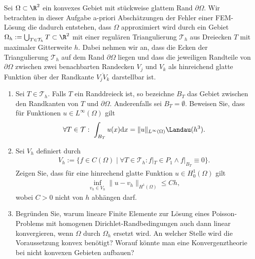 
\begin{exercise}

Sei $\Omega \subset \R^2$ ein konvexes Gebiet mit stückweise glattem Rand
$\partial \Omega$. Wir betrachten in dieser Aufgabe a-priori Abschätzungen der
Fehler einer FEM-Lösung die dadurch entstehen, dass $\Omega$ approximiert wird
durch ein Gebiet $\Omega_h := \bigcup_{T \in \mathcal{T}_h} T \subset \R^2$ mit
einer regulären Triangulierung $\mathcal{T}_h$ aus Dreiecken $T$ mit maximaler
Gitterweite $h$. Dabei nehmen wir an, dass die Ecken der Triangulierung
$\mathcal{T}_h$ auf dem Rand $\partial \Omega$ liegen und dass die jeweiligen
Randteile von $\partial \Omega$ zwischen zwei benachbarten Randecken $V_j$ und
$V_k$ als hinreichend glatte Funktion über der Randkante $\overline{V_jV_k}$
darstellbar ist.
\begin{enumerate}[label = \textbf{\alph*)}]
  \item Sei $T \in \mathcal{T}_h$. Falls $T$ ein Randdreieck ist, so bezeichne
  $B_T$ das Gebiet zwischen den Randkanten von $T$ und $\partial \Omega$.
  Anderenfalls sei $B_T = \emptyset$. Beweisen Sie, dass für Funktionen
  $u \in L^{\infty}(\Omega)$ gilt
  \begin{align}
    \forall T \in \mathcal{T}: \ \int_{B_T} u(x) \mathrm{d} x = \|u\|_{L^\infty(\Omega)}
    \Landau(h^3).
  \end{align}
  \item Sei $V_h$ definiert durch
  \begin{align}
    V_h := \{f \in C(\Omega) \mid \forall T \in \mathcal{T}_h:
    f|_T \in P_1 \land f|_{B_T} \equiv 0\}.
  \end{align}
  Zeigen Sie, dass für eine hinrechend glatte Funktion $u \in H_0^1(\Omega)$ gilt
  \begin{align}
    \inf_{v_h \in V_h} \|u - v_h\|_{H^1(\Omega)} \leq Ch,
  \end{align}
  wobei $C > 0$ nicht von $h$ abhängen darf.
  \item Begründen Sie, warum lineare Finite Elemente zur Lösung eines
  Poisson-Problems mit homogenen Dirichlet-Randbedingungen auch dann linear
  konvergieren, wenn $\Omega$ durch $\Omega_h$ ersetzt wird.
  An welcher Stelle wird die Voraussetzung konvex benötigt?
  Worauf könnte man eine Konvergenztheorie bei nicht konvexen Gebieten aufbauen?
\end{enumerate}

\end{exercise}

